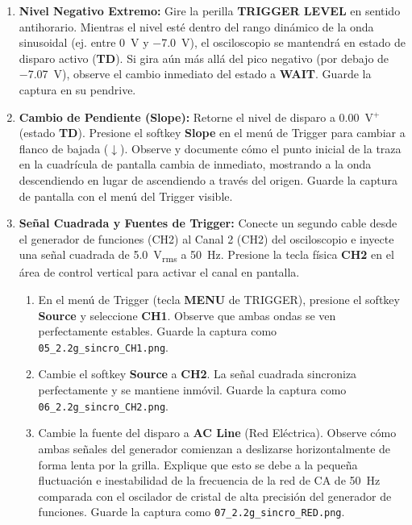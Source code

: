\documentclass[12pt, letterpaper]{article}
\begin{document}
\begin{enumerate}[label=\textbf{2.2.\alph*)}]
    \item \textbf{Nivel Negativo Extremo:} Gire la perilla \textbf{TRIGGER LEVEL} en sentido antihorario. Mientras el nivel esté dentro del rango dinámico de la onda sinusoidal (ej. entre \SI{0}{\volt} y \SI{-7.0}{\volt}), el osciloscopio se mantendrá en estado de disparo activo (\textbf{TD}). Si gira aún más allá del pico negativo (por debajo de \SI{-7.07}{\volt}), observe el cambio inmediato del estado a \textbf{WAIT}. Guarde la captura en su pendrive.
    
    \item \textbf{Cambio de Pendiente (Slope):} Retorne el nivel de disparo a \SI{0.00}{\volt}$^+$ (estado \textbf{TD}). Presione el softkey \textbf{Slope} en el menú de Trigger para cambiar a flanco de bajada ($\downarrow$). Observe y documente cómo el punto inicial de la traza en la cuadrícula de pantalla cambia de inmediato, mostrando a la onda descendiendo en lugar de ascendiendo a través del origen. Guarde la captura de pantalla con el menú del Trigger visible.
    
    \item \textbf{Señal Cuadrada y Fuentes de Trigger:} Conecte un segundo cable desde el generador de funciones (CH2) al Canal 2 (CH2) del osciloscopio e inyecte una señal cuadrada de \SI{5.0}{V_{rms}} a \SI{50}{Hz}. Presione la tecla física \textbf{CH2} en el área de control vertical para activar el canal en pantalla.
    \begin{enumerate}[label=\roman*.]
        \item En el menú de Trigger (tecla \textbf{MENU} de TRIGGER), presione el softkey \textbf{Source} y seleccione \textbf{CH1}. Observe que ambas ondas se ven perfectamente estables. Guarde la captura como \texttt{05\_2.2g\_sincro\_CH1.png}.
        \item Cambie el softkey \textbf{Source} a \textbf{CH2}. La señal cuadrada sincroniza perfectamente y se mantiene inmóvil. Guarde la captura como \texttt{06\_2.2g\_sincro\_CH2.png}.
        \item Cambie la fuente del disparo a \textbf{AC Line} (Red Eléctrica). Observe cómo ambas señales del generador comienzan a deslizarse horizontalmente de forma lenta por la grilla. Explique que esto se debe a la pequeña fluctuación e inestabilidad de la frecuencia de la red de CA de \SI{50}{Hz} comparada con el oscilador de cristal de alta precisión del generador de funciones. Guarde la captura como \texttt{07\_2.2g\_sincro\_RED.png}.
    \end{enumerate}
    

\end{enumerate}
\end{document}
